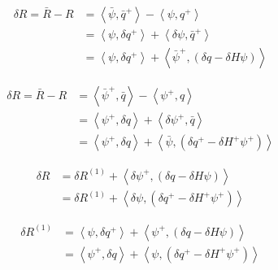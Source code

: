 \begin{equation*}\begin{split}
  \delta R = \bar{R} - R & = \left<\bar{\psi},\bar{q}^+\right> - \left<\psi,q^+\right> \\
                         & = \left<\psi,\delta q^+\right> + \left<\delta\psi,\bar{q}^+\right> \\
                         & = \left<\psi,\delta q^+\right> + \left<\bar{\psi}^+,\left(\delta q - \delta H\psi\right)\right>
\end{split}\end{equation*}

\begin{equation*}\begin{split}
  \delta R = \bar{R} - R & = \left<\bar{\psi}^+,\bar{q}\right> - \left<\psi^+,q\right> \\
                         & = \left<\psi^+,\delta q\right> + \left<\delta\psi^+,\bar{q}\right> \\
                         & = \left<\psi^+,\delta q\right> + \left<\bar{\psi},\left(\delta q^+ - \delta H^+\psi^+\right)\right>
\end{split}\end{equation*}

\begin{equation*}\begin{split}
  \delta R & = \delta R^{(1)} + \left<\delta\psi^+,\left(\delta q-\delta H\psi\right)\right> \\
           & = \delta R^{(1)} + \left<\delta\psi,\left(\delta q^+-\delta H^+\psi^+\right)\right>
\end{split}\end{equation*}

\begin{equation*}\begin{split}
  \delta R^{(1)} & = \left<\psi,\delta q^+\right> + \left<\psi^+,\left(\delta q - \delta H\psi\right)\right> \\
                 & = \left<\psi^+,\delta q\right> + \left<\psi,\left(\delta q^+ - \delta H^+\psi^+\right)\right>
\end{split}\end{equation*}

